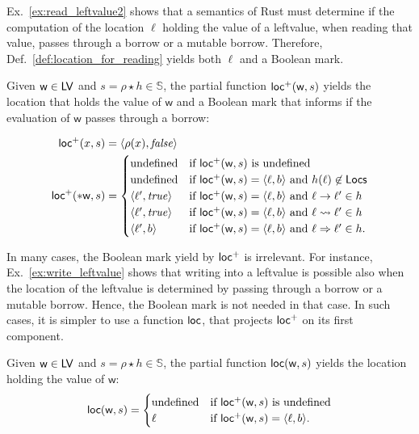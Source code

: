 Ex.~\ref{ex:read_leftvalue2} shows that a semantics of Rust must determine
if the computation of the location $\ell$ holding the value of a leftvalue, when reading that value,
passes through a borrow or a mutable borrow. Therefore, Def.~\ref{def:location_for_reading}
yields both $\ell$ and a Boolean mark.

\begin{definition}\label{def:location_for_reading}
  Given $\mathsf{w}\in\mathsf{LV}$ and $s=\rho\star h\in\mathbb{S}$, the
  partial function $\mathsf{loc^+}(\mathsf{w},s)$ yields the location that holds
  the value of $\mathsf{w}$ and a Boolean mark that informs if the evaluation
  of $\mathsf{w}$ passes through a borrow:

  \begin{align*}
    \mathsf{loc^+}(x,s) &= \langle\rho(x),\mathit{false}\rangle\\
    \mathsf{loc^+}(*\mathsf{w},s) &= \begin{cases}
      \text{undefined} & \text{if $\mathsf{loc^+}(\mathsf{w},s)$ is undefined}\\
      \text{undefined} & \text{if $\mathsf{loc^+}(\mathsf{w},s)=\langle\ell,b\rangle$ and $h(\ell)\not\in\mathsf{Locs}$}\\
      \langle \ell',\mathit{true}\rangle & \text{if $\mathsf{loc^+}(\mathsf{w},s)=\langle\ell,b\rangle$ and $\ell\to\ell'\in h$}\\
      \langle \ell',\mathit{true}\rangle & \text{if $\mathsf{loc^+}(\mathsf{w},s)=\langle\ell,b\rangle$ and $\ell\leadsto\ell'\in h$}\\
      \langle \ell',b\rangle & \text{if $\mathsf{loc^+}(\mathsf{w},s)=\langle\ell,b\rangle$ and $\ell\Rightarrow\ell'\in h$.}
    \end{cases}
  \end{align*}
\end{definition}

\noindent
In many cases, the Boolean mark yield by $\mathsf{loc^+}$ is irrelevant. For instance,
Ex.~\ref{ex:write_leftvalue} shows that writing into a leftvalue is possible also when
the location of the leftvalue is determined by passing through a borrow or a mutable borrow.
Hence, the Boolean mark is not needed in that case. In such cases, it is simpler
to use a function $\mathsf{loc}$, that projects $\mathsf{loc^+}$ on its first component.

\begin{definition}[Location]\label{def:location}
  Given $\mathsf{w}\in\mathsf{LV}$ and $s=\rho\star h\in\mathbb{S}$, the
  partial function $\mathsf{loc}(\mathsf{w},s)$ yields the location holding the value of $\mathsf{w}$:
  \[
    \mathsf{loc}(\mathsf{w},s) = \begin{cases}
      \text{undefined} & \text{if $\mathsf{loc^+}(\mathsf{w},s)$ is undefined}\\
      \ell & \text{if $\mathsf{loc^+}(\mathsf{w},s)=\langle\ell,b\rangle$.}
    \end{cases}
  \]
\end{definition}

